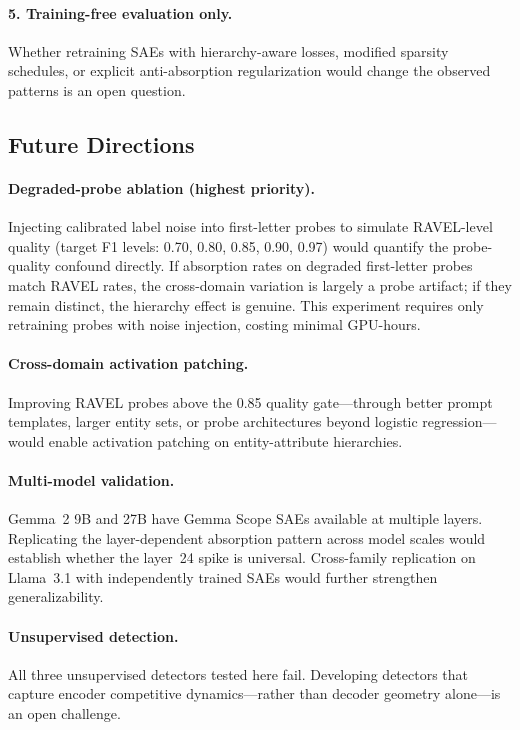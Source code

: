 \documentclass{article}
\begin{document}
\paragraph{5. Training-free evaluation only.} Whether retraining SAEs with hierarchy-aware losses, modified sparsity schedules, or explicit anti-absorption regularization would change the observed patterns is an open question.

\subsection{Future Directions}
\label{sec:future}

\paragraph{Degraded-probe ablation (highest priority).} Injecting calibrated label noise into first-letter probes to simulate RAVEL-level quality (target F1 levels: 0.70, 0.80, 0.85, 0.90, 0.97) would quantify the probe-quality confound directly. If absorption rates on degraded first-letter probes match RAVEL rates, the cross-domain variation is largely a probe artifact; if they remain distinct, the hierarchy effect is genuine. This experiment requires only retraining probes with noise injection, costing minimal GPU-hours.

\paragraph{Cross-domain activation patching.} Improving RAVEL probes above the 0.85 quality gate---through better prompt templates, larger entity sets, or probe architectures beyond logistic regression---would enable activation patching on entity-attribute hierarchies.

\paragraph{Multi-model validation.} Gemma~2 9B and 27B have Gemma Scope SAEs available at multiple layers. Replicating the layer-dependent absorption pattern across model scales would establish whether the layer~24 spike is universal. Cross-family replication on Llama~3.1 with independently trained SAEs would further strengthen generalizability.

\paragraph{Unsupervised detection.} All three unsupervised detectors tested here fail. Developing detectors that capture encoder competitive dynamics---rather than decoder geometry alone---is an open challenge.
\end{document}
